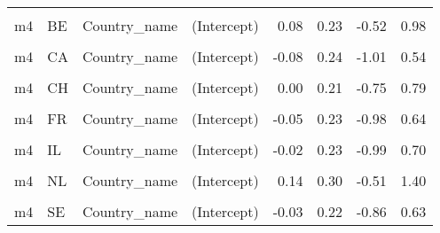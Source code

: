 \begin{table}
\begin{tabular}[t]{llllrrrr}
\cellcolor{gray!10}{m3.1} & \cellcolor{gray!10}{US} & \cellcolor{gray!10}{Country\_name} & \cellcolor{gray!10}{EPS} & \cellcolor{gray!10}{-0.03} & \cellcolor{gray!10}{0.11} & \cellcolor{gray!10}{-0.31} & \cellcolor{gray!10}{0.26}\\
m4 & BE & Country\_name & (Intercept) & 0.08 & 0.23 & -0.52 & 0.98\\
\cellcolor{gray!10}{m4} & \cellcolor{gray!10}{BE} & \cellcolor{gray!10}{Country\_name} & \cellcolor{gray!10}{EPS} & \cellcolor{gray!10}{0.18} & \cellcolor{gray!10}{0.12} & \cellcolor{gray!10}{-0.10} & \cellcolor{gray!10}{0.46}\\
m4 & CA & Country\_name & (Intercept) & -0.08 & 0.24 & -1.01 & 0.54\\
\cellcolor{gray!10}{m4} & \cellcolor{gray!10}{CA} & \cellcolor{gray!10}{Country\_name} & \cellcolor{gray!10}{EPS} & \cellcolor{gray!10}{-0.16} & \cellcolor{gray!10}{0.12} & \cellcolor{gray!10}{-0.46} & \cellcolor{gray!10}{0.12}\\
m4 & CH & Country\_name & (Intercept) & 0.00 & 0.21 & -0.75 & 0.79\\
\cellcolor{gray!10}{m4} & \cellcolor{gray!10}{CH} & \cellcolor{gray!10}{Country\_name} & \cellcolor{gray!10}{EPS} & \cellcolor{gray!10}{-0.01} & \cellcolor{gray!10}{0.11} & \cellcolor{gray!10}{-0.27} & \cellcolor{gray!10}{0.24}\\
m4 & FR & Country\_name & (Intercept) & -0.05 & 0.23 & -0.98 & 0.64\\
\cellcolor{gray!10}{m4} & \cellcolor{gray!10}{FR} & \cellcolor{gray!10}{Country\_name} & \cellcolor{gray!10}{EPS} & \cellcolor{gray!10}{-0.14} & \cellcolor{gray!10}{0.12} & \cellcolor{gray!10}{-0.42} & \cellcolor{gray!10}{0.12}\\
m4 & IL & Country\_name & (Intercept) & -0.02 & 0.23 & -0.99 & 0.70\\
\cellcolor{gray!10}{m4} & \cellcolor{gray!10}{IL} & \cellcolor{gray!10}{Country\_name} & \cellcolor{gray!10}{EPS} & \cellcolor{gray!10}{-0.02} & \cellcolor{gray!10}{0.21} & \cellcolor{gray!10}{-0.50} & \cellcolor{gray!10}{0.48}\\
m4 & NL & Country\_name & (Intercept) & 0.14 & 0.30 & -0.51 & 1.40\\
\cellcolor{gray!10}{m4} & \cellcolor{gray!10}{NL} & \cellcolor{gray!10}{Country\_name} & \cellcolor{gray!10}{EPS} & \cellcolor{gray!10}{0.32} & \cellcolor{gray!10}{0.14} & \cellcolor{gray!10}{-0.04} & \cellcolor{gray!10}{0.61}\\
m4 & SE & Country\_name & (Intercept) & -0.03 & 0.22 & -0.86 & 0.63\\

\end{tabular}
\end{table}
